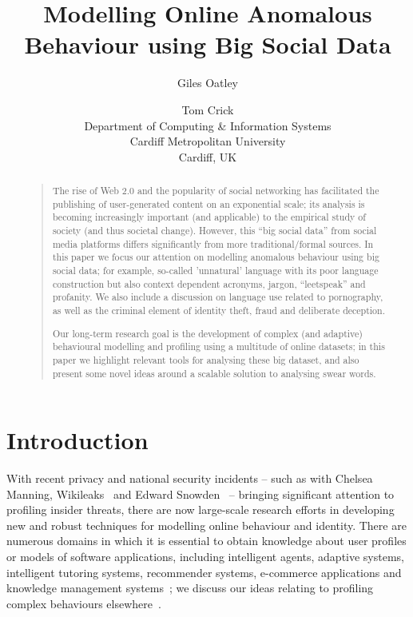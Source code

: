 \documentclass[letterpaper]{article}
\begin{document}
\title{Modelling Online Anomalous Behaviour using Big Social Data}
\author{Giles Oatley \and Tom Crick\\
Department of Computing \& Information Systems\\
Cardiff Metropolitan University\\
Cardiff, UK
}

\maketitle

\begin{abstract}
\begin{quote}
The rise of Web 2.0 and the popularity of social networking has
facilitated the publishing of user-generated content on an exponential
scale; its analysis is becoming increasingly important (and
applicable) to the empirical study of society (and thus societal
change). However, this ``big social data'' from social media platforms
differs significantly from more traditional/formal sources.  In this
paper we focus our attention on modelling anomalous behaviour using
big social data; for example, so-called 'unnatural' language with its
poor language construction but also context dependent acronyms,
jargon, ``leetspeak'' and profanity. We also include a discussion on
language use related to pornography, as well as the criminal element
of identity theft, fraud and deliberate deception.

Our long-term research goal is the development of complex (and
adaptive) behavioural modelling and profiling using a multitude of
online datasets; in this paper we highlight relevant tools for
analysing these big dataset, and also present some novel ideas around
a scalable solution to analysing swear words.
\end{quote}
\end{abstract}


\section{Introduction}

With recent privacy and national security incidents -- such as with
Chelsea Manning, Wikileaks~\cite{wikileaks:2013} and Edward
Snowden~\cite{greenwald:2014} -- bringing significant attention to
profiling insider threats, there are now large-scale research efforts in
developing new and robust techniques for modelling online behaviour
and identity. There are numerous domains in which it is essential to
obtain knowledge about user profiles or models of software
applications, including intelligent agents, adaptive systems,
intelligent tutoring systems, recommender systems, e-commerce
applications and knowledge management
systems~\cite{schiaffino+amandi:2009}; we discuss our ideas relating
to profiling complex behaviours elsewhere~\cite{oatley+crick:2014}.
\end{document}
